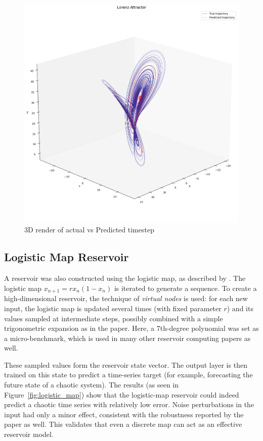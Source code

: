 \documentclass[numbered]{ivt-style/standard}
\begin{document}
\begin{figure}[H]
    \centering
    \includegraphics[width=1\linewidth]{figures/lorentz_pendulum_2.png}
    \caption{3D render of actual vs Predicted timestep}
    \label{fig:lorentz_2}
\end{figure}



\subsection{Logistic Map Reservoir}
A reservoir was also constructed using the logistic map, as described by \cite{Arun2024}.  The logistic map $x_{n+1} = r x_n (1-x_n)$ is iterated to generate a sequence.  To create a high-dimensional reservoir, the technique of \emph{virtual nodes} is used: for each new input, the logistic map is updated several times (with fixed parameter $r$) and its values sampled at intermediate steps, possibly combined with a simple trigonometric expansion as in the paper. Here, a 7th-degree polynomial was set as a micro-benchmark, which is used in many other reservoir computing papers as well.

These sampled values form the reservoir state vector.  The output layer is then trained on this state to predict a time-series target (for example, forecasting the future state of a chaotic system).  The results (as seen in Figure~\ref{fig:logistic_map}) show that the logistic-map reservoir could indeed predict a chaotic time series with relatively low error.  Noise perturbations in the input had only a minor effect, consistent with the robustness reported by the paper as well. This validates that even a discrete map can act as an effective reservoir model.
\end{document}
